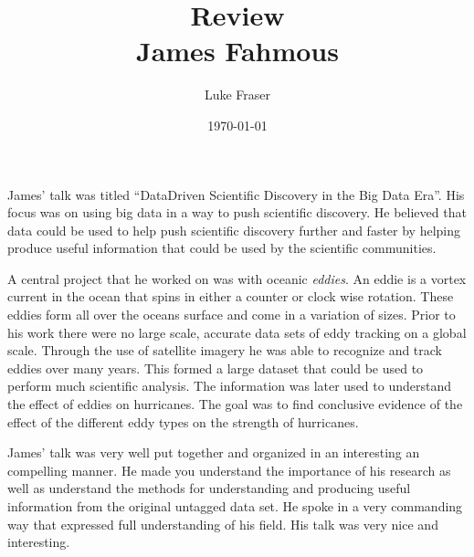 \documentclass{article}
\begin{document}
\title{{\large Review} \\ James Fahmous}
\author{Luke Fraser}
\date{\today}
\maketitle

\begingroup
\renewcommand{\section}[2]{}


\endgroup

\section*{Summary}
James' talk was titled ``Data­Driven Scientific Discovery in the Big Data Era''. His focus was on using big data in a way to push scientific discovery. He believed that data could be used to help push scientific discovery further and faster by helping produce useful information that could be used by the scientific communities.

A central project that he worked on was with oceanic \emph{eddies}. An eddie is a vortex current in the ocean that spins in either a counter or clock wise rotation. These eddies form all over the oceans surface and come in a variation of sizes. Prior to his work there were no large scale, accurate data sets of eddy tracking on a global scale. Through the use of satellite imagery he was able to recognize and track eddies over many years. This formed a large dataset that could be used to perform much scientific analysis. The information was later used to understand the effect of eddies on hurricanes. The goal was to find conclusive evidence of the effect of the different eddy types on the strength of hurricanes.

\section*{Strengths}
James' talk was very well put together and organized in an interesting an compelling manner. He made you understand the importance of his research as well as understand the methods for understanding and producing useful information from the original untagged data set. He spoke in a very commanding way that expressed full understanding of his field. His talk was very nice and interesting.
\end{document}
